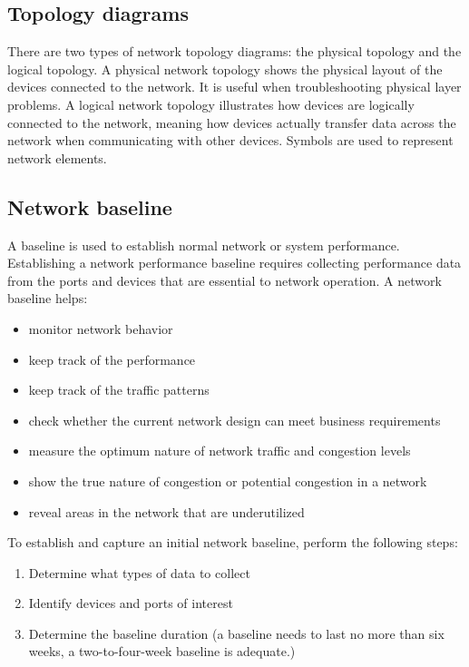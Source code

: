 \subsection{Topology diagrams}

There are two types of network topology diagrams: the physical topology and the logical topology. A physical network topology shows the physical layout of the devices connected to the network. It is useful when troubleshooting physical layer problems. A logical network topology illustrates how devices are logically connected to the network, meaning how devices actually transfer data across the network when communicating with other devices. Symbols are used to represent network elements.

\subsection{Network baseline}

A baseline is used to establish normal network or system performance. Establishing a network performance baseline requires collecting performance data from the ports and devices that are essential to network operation. A network baseline helps:

\begin{itemize}
\item monitor network behavior
\item keep track of the performance
\item keep track of the traffic patterns
\item check whether the current network design can meet business requirements
\item measure the optimum nature of network traffic and congestion levels
\item show the true nature of congestion or potential congestion in a network
\item reveal areas in the network that are underutilized 
\end{itemize}

To establish and capture an initial network baseline, perform the following steps:

\begin{enumerate}
\item Determine what types of data to collect
\item Identify devices and ports of interest
\item Determine the baseline duration (a baseline needs to last no more than six weeks, a two-to-four-week baseline is adequate.)
\end{enumerate}

